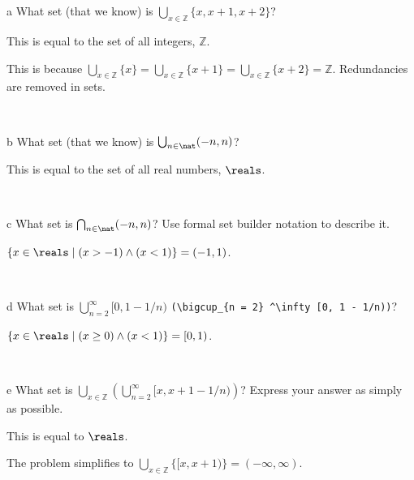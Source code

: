\documentclass{article}
\begin{document}
\section{}


\begin{problem} a
What set (that we know) is $\bigcup _{x \in \mathbb{Z}} \{x, x + 1, x + 2\}$?
\end{problem}

This is equal to the set of all integers, $\mathbb{Z}$. 

This is because $\bigcup \limits_{x \in \mathbb{Z}} \{x\} = 
\bigcup \limits_{x \in \mathbb{Z}} \{x + 1\} =
\bigcup \limits_{x \in \mathbb{Z}} \{x + 2\} =
\mathbb{Z}$. Redundancies are removed in sets.


\


\begin{problem} b
What set (that we know) is $\bigcup _{n \in \nat} (-n, n)$?
\end{problem}

This is equal to the set of all real numbers, $\reals$.


\

\begin{problem} c
What set is $\bigcap _{n \in \nat} (-n, n)$? Use formal set builder notation to describe it.
\end{problem}

$\{ x \in \reals \mid (x > -1) \land (x < 1) \} = (-1,1)$.

\

\begin{problem} d
What set is $\bigcup_{n = 2} ^\infty [0, 1 - 1/n)$ \verb+(\bigcup_{n = 2} ^\infty [0, 1 - 1/n))+?
\end{problem}

$\{ x \in \reals \mid ( x \geq 0 ) \land (x < 1) \} = [0,1)$.


\

\begin{problem} e
What set is $\bigcup_{x \in \mathbb{Z}} \left( \bigcup_{n = 2} ^\infty [x, x + 1 - 1/n) \right)$? Express your answer as simply as possible.
\end{problem}

This is equal to $\reals$.

The problem simplifies to $\bigcup \limits_{x \in \mathbb{Z}} \{[x, x+1)\} = (-\infty, \infty)$.


\
\hline
\end{document}
